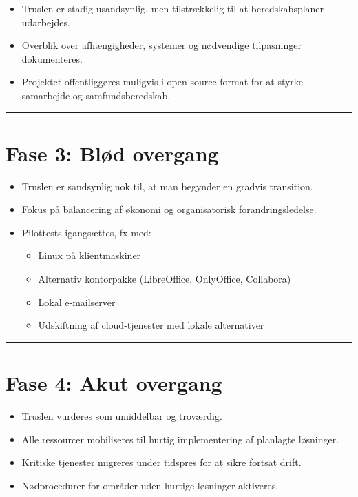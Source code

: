 \documentclass[a4paper,11pt]{book}
\begin{document}
\begin{itemize}
\tightlist
\item
  Truslen er stadig usandsynlig, men tilstrækkelig til at
  beredskabsplaner udarbejdes.
\item
  Overblik over afhængigheder, systemer og nødvendige tilpasninger
  dokumenteres.
\item
  Projektet offentliggøres muligvis i open source-format for at styrke
  samarbejde og samfundsberedskab.
\end{itemize}

\begin{center}\rule{0.5\linewidth}{0.5pt}\end{center}

\section{Fase 3: Blød overgang}\label{fase-3-bluxf8d-overgang}

\begin{itemize}
\item
  Truslen er sandsynlig nok til, at man begynder en gradvis transition.
\item
  Fokus på balancering af økonomi og organisatorisk forandringsledelse.
\item
  Pilottests igangsættes, fx med:

  \begin{itemize}
  \tightlist
  \item
    Linux på klientmaskiner
  \item
    Alternativ kontorpakke (LibreOffice, OnlyOffice, Collabora)
  \item
    Lokal e-mailserver
  \item
    Udskiftning af cloud-tjenester med lokale alternativer
  \end{itemize}
\end{itemize}

\begin{center}\rule{0.5\linewidth}{0.5pt}\end{center}

\section{Fase 4: Akut overgang}\label{fase-4-akut-overgang}

\begin{itemize}
\tightlist
\item
  Truslen vurderes som umiddelbar og troværdig.
\item
  Alle ressourcer mobiliseres til hurtig implementering af planlagte
  løsninger.
\item
  Kritiske tjenester migreres under tidspres for at sikre fortsat drift.
\item
  Nødprocedurer for områder uden hurtige løsninger aktiveres.
\end{itemize}
\end{document}
